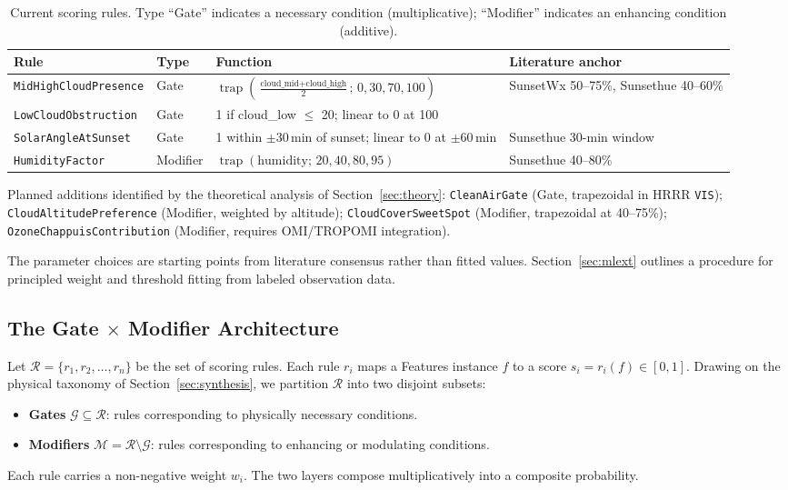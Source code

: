 \documentclass[11pt,a4paper]{article}
\DeclareMathOperator{\trap}{trap}
\begin{document}
\begin{table}[H]
\centering
\small
\begin{tabular}{p{3.0cm}p{1.8cm}p{6.0cm}p{3.5cm}}
\toprule
Rule & Type & Function & Literature anchor \\
\midrule
\texttt{MidHighCloudPresence} & Gate & $\trap\left(\frac{\text{cloud\_mid}+\text{cloud\_high}}{2};\, 0, 30, 70, 100\right)$ & SunsetWx 50--75\%, Sunsethue 40--60\% \\
\texttt{LowCloudObstruction} & Gate & 1 if cloud\_low $\leq$ 20; linear to 0 at 100 & \citet{corfidi2014colors} \\
\texttt{SolarAngleAtSunset} & Gate & 1 within $\pm 30$\,min of sunset; linear to 0 at $\pm 60$\,min & Sunsethue 30-min window \\
\texttt{HumidityFactor} & Modifier & $\trap(\text{humidity};\, 20, 40, 80, 95)$ & Sunsethue 40--80\% \\
\bottomrule
\end{tabular}
\caption{Current scoring rules. Type ``Gate'' indicates a necessary condition (multiplicative); ``Modifier'' indicates an enhancing condition (additive).}
\label{tab:rules}
\end{table}

Planned additions identified by the theoretical analysis of Section~\ref{sec:theory}: \texttt{CleanAirGate} (Gate, trapezoidal in HRRR \texttt{VIS}); \texttt{CloudAltitudePreference} (Modifier, weighted by altitude); \texttt{CloudCoverSweetSpot} (Modifier, trapezoidal at 40--75\%); \texttt{OzoneChappuisContribution} (Modifier, requires OMI/TROPOMI integration).

The parameter choices are starting points from literature consensus rather than fitted values. Section~\ref{sec:mlext} outlines a procedure for principled weight and threshold fitting from labeled observation data.

\subsection{The Gate $\times$ Modifier Architecture}
\label{sec:gatemodifier}

Let $\mathcal{R} = \{r_1, r_2, \ldots, r_n\}$ be the set of scoring rules. Each rule $r_i$ maps a Features instance $f$ to a score $s_i = r_i(f) \in [0, 1]$. Drawing on the physical taxonomy of Section~\ref{sec:synthesis}, we partition $\mathcal{R}$ into two disjoint subsets:
\begin{itemize}
\item \textbf{Gates} $\mathcal{G} \subseteq \mathcal{R}$: rules corresponding to physically necessary conditions.
\item \textbf{Modifiers} $\mathcal{M} = \mathcal{R} \setminus \mathcal{G}$: rules corresponding to enhancing or modulating conditions.
\end{itemize}
Each rule carries a non-negative weight $w_i$. The two layers compose multiplicatively into a composite probability.
\end{document}

